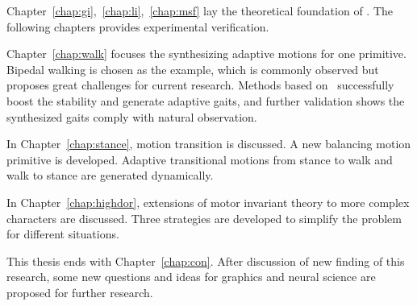 Chapter~\ref{chap:gi},~\ref{chap:li},~\ref{chap:msf} lay the theoretical foundation of {\moit}.
The following chapters provides experimental verification.



Chapter~\ref{chap:walk} focuses the synthesizing adaptive motions for one primitive.
Bipedal walking is chosen as the example, which is commonly observed but proposes great challenges for current \cms research.
Methods based on {\moit}\ successfully boost the stability and generate adaptive gaits, and further validation shows the synthesized gaits comply with natural observation. 

In Chapter~\ref{chap:stance}, motion transition is discussed. 
A new balancing motion primitive is developed. 
Adaptive transitional motions from stance to walk and walk to stance are generated dynamically.


In Chapter~\ref{chap:highdor}, extensions of motor invariant theory to more complex characters are discussed.
Three strategies are developed to simplify the problem for different situations.

This thesis ends with Chapter~\ref{chap:con}. 
After discussion of new finding of this research, some new questions and ideas for graphics and neural science are proposed for further research.








